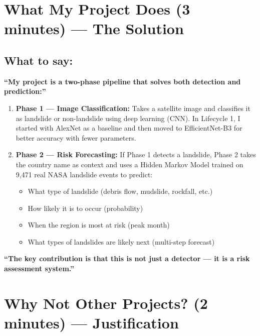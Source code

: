 \documentclass[11pt]{article}
\begin{document}
\section{What My Project Does (3 minutes) --- The Solution}

\subsection{What to say:}

\textbf{``My project is a two-phase pipeline that solves both detection and prediction:''}

\begin{enumerate}
    \item \textbf{Phase 1 --- Image Classification:} Takes a satellite image and classifies it as landslide or non-landslide using deep learning (CNN). In Lifecycle 1, I started with AlexNet as a baseline and then moved to EfficientNet-B3 for better accuracy with fewer parameters.

    \item \textbf{Phase 2 --- Risk Forecasting:} If Phase 1 detects a landslide, Phase 2 takes the country name as context and uses a Hidden Markov Model trained on 9,471 real NASA landslide events to predict:
    \begin{itemize}[noitemsep]
        \item What type of landslide (debris flow, mudslide, rockfall, etc.)
        \item How likely it is to occur (probability)
        \item When the region is most at risk (peak month)
        \item What types of landslides are likely next (multi-step forecast)
    \end{itemize}
\end{enumerate}

\textbf{``The key contribution is that this is not just a detector --- it is a risk assessment system.''}

\section{Why Not Other Projects? (2 minutes) --- Justification}
\end{document}
